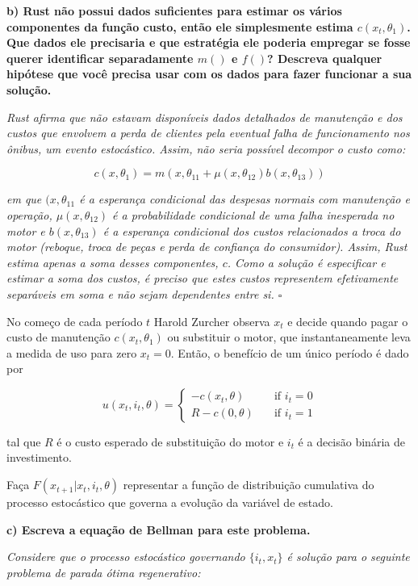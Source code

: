 \documentclass[12pt,a4paper]{article}
\begin{document}
\textbf{b) Rust não possui dados suficientes para estimar os vários
componentes da função custo, então ele simplesmente estima
\(c(x_t, \theta_1)\). Que dados ele precisaria e que estratégia ele
poderia empregar se fosse querer identificar separadamente \(m()\) e
\(f()\)? Descreva qualquer hipótese que você precisa usar com os dados
para fazer funcionar a sua solução.}

\emph{Rust afirma que não estavam disponíveis dados detalhados de
manutenção e dos custos que envolvem a perda de clientes pela eventual
falha de funcionamento nos ônibus, um evento estocástico. Assim, não
seria possível decompor o custo como:}

\[
c(x,\theta_1) = m(x,\theta_{11}+\mu(x,\theta_{12})b(x,\theta_{13}))
\]

\emph{em que \((x,\theta_{11}\) é a esperança condicional das despesas
normais com manutenção e operação, \(\mu(x,\theta_{12})\) é a
probabilidade condicional de uma falha inesperada no motor e
\(b(x,\theta_{13})\) é a esperança condicional dos custos relacionados a
troca do motor (reboque, troca de peças e perda de confiança do
consumidor). Assim, Rust estima apenas a soma desses componentes, \(c\).
Como a solução é especificar e estimar a soma dos custos, é preciso que
estes custos representem efetivamente separáveis em soma e não sejam
dependentes entre si. \(\square\)}

No começo de cada período \(t\) Harold Zurcher observa \(x_t\) e decide
quando pagar o custo de manutenção \(c(x_t, \theta_1)\) ou substituir o
motor, que instantaneamente leva a medida de uso para zero \(x_t = 0\).
Então, o benefício de um único período é dado por

\[ u(x_t,i_t,\theta) = 
  \begin{cases}
    -c(x_t,\theta)    & \quad \text{if } i_t=0\\
    R - c(0,\theta)  & \quad \text{if } i_t=1
  \end{cases}
\]

tal que \(R\) é o custo esperado de substituição do motor e \(i_t\) é a
decisão binária de investimento.

Faça \(F(x_{t+1}| x_t, i_t, \theta)\) representar a função de
distribuição cumulativa do processo estocástico que governa a evolução
da variável de estado.

\textbf{c) Escreva a equação de Bellman para este problema.}

\emph{Considere que o processo estocástico governando \(\{i_t,x_t\}\) é
solução para o seguinte problema de parada ótima regenerativo:}
\end{document}

